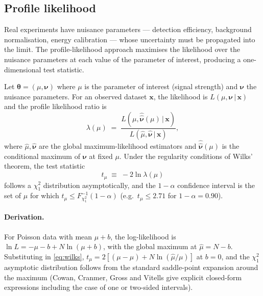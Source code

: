 \subsection{Profile likelihood}
\label{sec:profile-likelihood}

\begin{phenomenon}
Real experiments have nuisance parameters --- detection efficiency,
background normalisation, energy calibration --- whose uncertainty
must be propagated into the limit. The profile-likelihood approach
maximises the likelihood over the nuisance parameters at each value
of the parameter of interest, producing a one-dimensional test
statistic.
\end{phenomenon}

\begin{statement}
\label{stmt:profile-likelihood}
Let $\bm{\theta}=(\mu,\bm{\nu})$ where $\mu$ is the parameter of
interest (signal strength) and $\bm{\nu}$ the nuisance parameters.
For an observed dataset $\bm x$, the likelihood is
$L(\mu,\bm\nu\,|\,\bm x)$ and the profile likelihood ratio is
\begin{equation}
\label{eq:profile-ratio}
\lambda(\mu) \;=\; \frac{L(\mu,\hat{\hat{\bm\nu}}(\mu)\,|\,\bm x)}
{L(\hat\mu,\hat{\bm\nu}\,|\,\bm x)},
\end{equation}
where $\hat\mu,\hat{\bm\nu}$ are the global maximum-likelihood
estimators and $\hat{\hat{\bm\nu}}(\mu)$ is the conditional maximum
of $\bm\nu$ at fixed $\mu$. Under the regularity conditions of
Wilks' theorem, the test statistic
\begin{equation}
\label{eq:wilks}
t_\mu \;\equiv\; -2\ln\lambda(\mu)
\end{equation}
follows a $\chi^2_1$ distribution asymptotically, and the
$1-\alpha$ confidence interval is the set of $\mu$ for which
$t_\mu\leq F^{-1}_{\chi^2_1}(1-\alpha)$ (e.g.\ $t_\mu\leq 2.71$ for
$1-\alpha=0.90$).
\end{statement}

\paragraph{Derivation.}
For Poisson data with mean $\mu+b$, the log-likelihood is
$\ln L=-\mu-b+N\ln(\mu+b)$, with the global maximum at
$\hat\mu=N-b$. Substituting in \cref{eq:wilks},
$t_\mu=2[(\mu-\hat\mu)+N\ln(\hat\mu/\mu)]$ at $b=0$, and the
$\chi^2_1$ asymptotic distribution follows from the standard
saddle-point expansion around the maximum (Cowan, Cranmer, Gross
and Vitells \cite{cowan2011} give explicit closed-form expressions
including the case of one or two-sided intervals).

